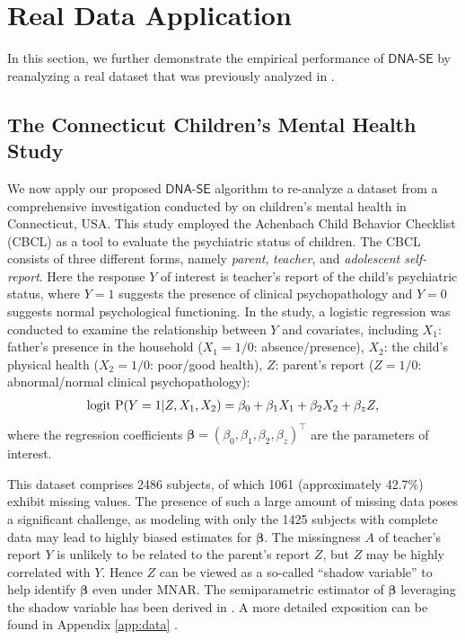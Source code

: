 \documentclass{article}
\def\logit{\mathrm{logit}}
\def\dnase{{\mathsf{DNA\mbox{-}SE}}}
\theoremstyle{plain}
\theoremstyle{definition}
\theoremstyle{remark}
\def\P{\mathrm{P}}
\def\bbeta{\boldsymbol{\beta}}
\begin{document}
\section{Real Data Application}
\label{sec:data}

In this section, we further demonstrate the empirical performance of $\dnase$ by reanalyzing a real dataset that was previously analyzed in \citet{zhao2022versatile}.

\subsection{The Connecticut Children's Mental Health Study}

We now apply our proposed $\dnase$ algorithm to re-analyze a dataset from a comprehensive investigation conducted by \citet{zahner1997factors} on children's mental health in Connecticut, USA. This study employed the Achenbach Child Behavior Checklist (CBCL) as a tool to evaluate the psychiatric status of children. The CBCL consists of three different forms, namely \textit{parent}, \textit{teacher}, and \textit{adolescent self-report}. Here the response $Y$ of interest is teacher's report of the child's psychiatric status, where $Y = 1$ suggests the presence of clinical psychopathology and $Y = 0$ suggests normal psychological functioning. In the study, a logistic regression was conducted to examine the relationship between $Y$ and covariates, including $X_{1}$: father's presence in the household ($X_{1} = 1/0$: absence/presence), $X_{2}$: the child's physical health ($X_{2} = 1/0$: poor/good health), $Z$: parent's report ($Z = 1/0$: abnormal/normal clinical psychopathology):
\begin{align*}
\small
\logit \ \P (Y = 1 | Z, X_{1}, X_{2}) = \beta_{0} + \beta_{1} X_{1} + \beta_{2} X_{2} + \beta_{z} Z,
\end{align*}
where the regression coefficients $\bbeta = (\beta_{0}, \beta_{1}, \beta_{2}, \beta_{z})^{\top}$ are the parameters of interest. 

This dataset comprises 2486 subjects, of which 1061 (approximately 42.7\%) exhibit missing values. The presence of such a large amount of missing data poses a significant challenge, as modeling with only the 1425 subjects with complete data may lead to highly biased estimates for $\bbeta$. The missingness $A$ of teacher's report $Y$ is unlikely to be related to the parent's report $Z$, but $Z$ may be highly correlated with $Y$. Hence $Z$ can be viewed as a so-called ``shadow variable'' \citep{miao2024identification} to help identify $\bbeta$ even under MNAR. The semiparametric estimator of $\bbeta$ leveraging the shadow variable has been derived in \citet{zhao2022versatile}. A more detailed exposition can be found in Appendix \ref{app:data} .
\end{document}
